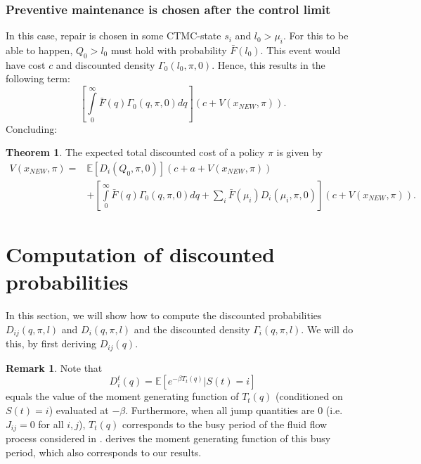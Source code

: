 \documentclass[a4paper]{thesis}
\theoremstyle{definition}
\newtheorem{remark}{Remark}[chapter]
\newtheorem{theorem}{Theorem}[chapter]
\begin{document}
\subsubsection{Preventive maintenance is chosen after the control limit}
In this case, repair is chosen in some CTMC-state $s_i$ and $l_0>\mu_i$.
For this to be able to happen, $Q_0>l_0$ must hold with probability $\bar{F}(l_0)$.
This event would have cost $c$ and discounted density $\Gamma_0(l_0,\pi,0)$.
Hence, this results in the following term:
\[
\left[\int\limits_0^\infty \bar{F}(q)\Gamma_0(q,\pi,0)dq\right](c+V(x_{NEW},\pi)).
\]
Concluding:
\begin{theorem}
	The expected total discounted cost of a policy $\pi$ is given by
	\begin{equation}\label{eq:MmfmTDC}
	\begin{split}
	V(x_{NEW},\pi)=&\mathbb{E}[D_{i}(Q_0,\pi,0)]\left(c+a+V(x_{NEW},\pi)\right)\\
	&+\left[\int\limits_0^\infty \bar{F}(q)\Gamma_0(q,\pi,0)dq+\sum\limits_i\bar{F}(\mu_i)D_{i}(\mu_i,\pi,0)\right]\left(c+V(x_{NEW},\pi)\right).
	\end{split}
	\end{equation}
\end{theorem} \section{Computation of discounted probabilities}
In this section, we will show how to compute the discounted probabilities $D_{ij}(q,\pi,l)$ and $D_{i}(q,\pi,l)$ and the discounted density $\Gamma_i(q,\pi,l)$.
We will do this, by first deriving $D_{ij}(q)$.

\begin{remark}
Note that
\[
D_i^t(q)=\mathbb{E}[e^{-\beta T_t(q)}|S(t)=i]
\]	
equals the value of the moment generating function of $T_t(q)$ (conditioned on $S(t)=i$) evaluated at $-\beta$.
Furthermore, when all jump quantities are 0 (i.e. $J_{ij}=0$ for all $i,j$), $T_t(q)$ corresponds to the busy period of the fluid flow process considered in \cite{Asmussen1994}. 
\cite{Asmussen1994} derives the moment generating function of this busy period, which also corresponds to our results.
\end{remark}
\end{document}
